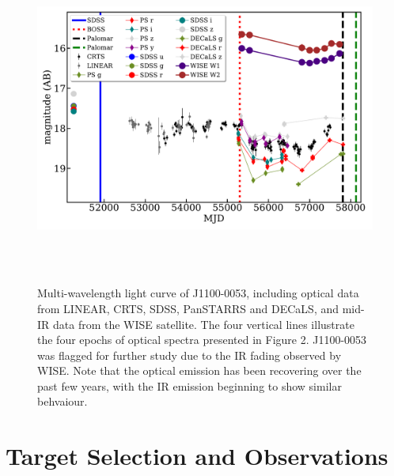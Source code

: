 \documentclass[a4paper,fleqn,usenatbib]{mnras}
\begin{document}
\begin{figure}
  \centering
  \includegraphics[width=16.00cm, height=11.00cm, trim=0.0cm 0.0cm 0.0cm 0.0cm, clip]
  {J110057_lc_20180501.pdf}
  \caption[]{
    Multi-wavelength light curve of J1100-0053, including optical data
    from LINEAR, CRTS, SDSS, PanSTARRS and DECaLS, and mid-IR data from
    the WISE satellite.  The four vertical lines illustrate the four
    epochs of optical spectra presented in Figure 2.  J1100-0053 was
    flagged for further study due to the IR fading observed by WISE.  Note
    that the optical emission has been recovering over the past few years,
    with the IR emission beginning to show similar behvaiour.}
  \label{fig:J110057_LC_CRTS}
\end{figure}
\section{Target Selection and Observations}  
\end{document}
